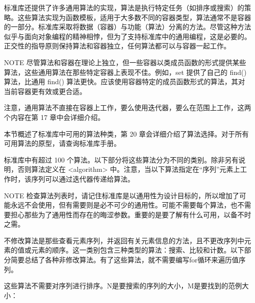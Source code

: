 
标准库还提供了许多通用算法的实现，算法是执行特定任务（如排序或搜索）的策略。这些算法实现为函数模板，适用于大多数不同的容器类型，算法通常不是容器的一部分。标准库采取将数据（容器）与功能（算法）分离的方法。尽管这种方法似乎与面向对象编程的精神相悖，但为了支持标准库中的通用编程，这是必要的。正交性的指导原则保持算法和容器独立，任何算法都可以与容器一起工作。

\begin{myNotic}{NOTE}
尽管算法和容器在理论上独立，但一些容器以类成员函数的形式提供某些算法，这些通用算法在那些特定容器上表现不佳。例如，set 提供了自己的 find() 算法，比通用 find() 算法更快。应该使用容器特定的成员函数形式的算法，其对当前容器更有效或更合适。
\end{myNotic}

注意，通用算法不直接在容器上工作，要么使用迭代器，要么在范围上工作，这两个内容在第 17 章中会详细介绍。

本节概述了标准库中可用的算法种类，第 20 章会详细介绍了算法选择。对于所有可用算法的原型，请查询标准库手册。

标准库中有超过 100 个算法。以下部分将这些算法分为不同的类别。除非另有说明，否则算法定义在 <algorithm> 中。注意，当以下算法指定在“序列”元素上工作时，该序列可以通过迭代器传递给算法。

\begin{myNotic}{NOTE}
检查算法列表时，请记住标准库是以通用性为设计目标的，所以增加了可能永远不会使用，但有需要则是必不可少的通用性。可能不需要每个算法，也不需要担心那些为了通用性而存在的晦涩参数。重要的是要了解有什么可用，以备不时之需。
\end{myNotic}


不修改算法是那些查看元素序列，并返回有关元素信息的方法，且不更改序列中元素的值或元素的顺序。这一类别包含三种类型的算法：搜索、比较和计数。以下部分简要总结了各种非修改算法。有了这些算法，就不需要编写for循环来遍历值序列。


这些算法不需要对序列进行排序。N是要搜索的序列的大小，M是要找到的范例大小：

